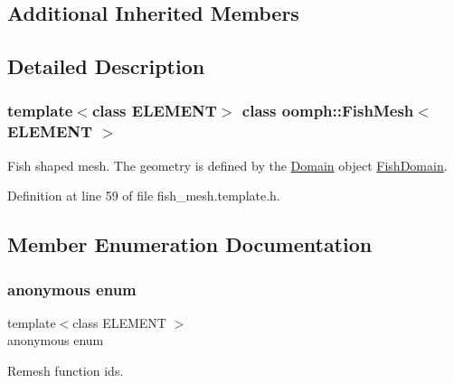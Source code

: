 \subsection*{Additional Inherited Members}


\subsection{Detailed Description}
\subsubsection*{template$<$class E\+L\+E\+M\+E\+NT$>$\newline
class oomph\+::\+Fish\+Mesh$<$ E\+L\+E\+M\+E\+N\+T $>$}

Fish shaped mesh. The geometry is defined by the \hyperlink{classoomph_1_1Domain}{Domain} object \hyperlink{classoomph_1_1FishDomain}{Fish\+Domain}. 

Definition at line 59 of file fish\+\_\+mesh.\+template.\+h.



\subsection{Member Enumeration Documentation}
\mbox{\label{classoomph_1_1FishMesh_a3b60ba4a8b5b7efe9f6f91846bd484eb}} 
\subsubsection{\texorpdfstring{anonymous enum}{anonymous enum}}
{\footnotesize\ttfamily template$<$class E\+L\+E\+M\+E\+NT $>$ \\
anonymous enum\hspace{0.3cm}{\ttfamily [protected]}}



Remesh function ids. 

